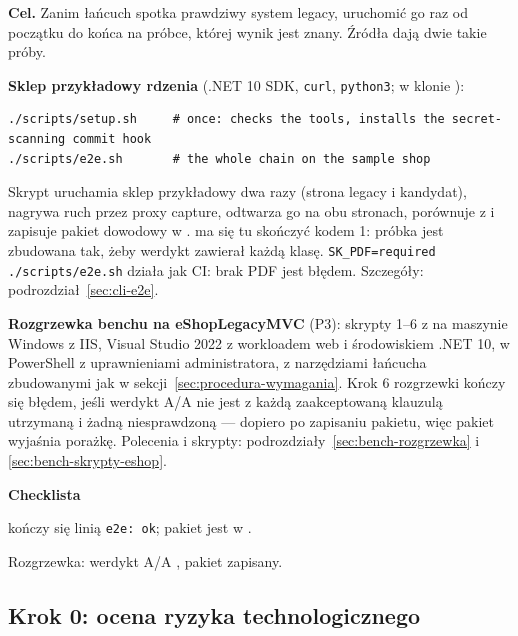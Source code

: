 \textbf{Cel.} Zanim łańcuch spotka prawdziwy system legacy, uruchomić go raz od początku do
końca na próbce, której wynik jest znany. Źródła dają dwie takie próby.

\textbf{Sklep przykładowy rdzenia} (.NET 10 SDK, \texttt{curl}, \texttt{python3}; w klonie
):
\begin{lstlisting}
./scripts/setup.sh     # once: checks the tools, installs the secret-scanning commit hook
./scripts/e2e.sh       # the whole chain on the sample shop
\end{lstlisting}
Skrypt uruchamia sklep przykładowy dwa razy (strona legacy i kandydat), nagrywa ruch przez
proxy capture, odtwarza go na obu stronach, porównuje z 
i zapisuje pakiet dowodowy w .  ma się
tu skończyć kodem 1: próbka jest zbudowana tak, żeby werdykt zawierał każdą klasę.
\texttt{SK\_PDF=required ./scripts/e2e.sh} działa jak CI: brak PDF jest błędem.
Szczegóły: podrozdział~\ref{sec:cli-e2e}.

\textbf{Rozgrzewka benchu na eShopLegacyMVC} (P3): skrypty 1--6 z  na
maszynie Windows z IIS, Visual Studio 2022 z workloadem web i środowiskiem .NET 10,
w PowerShell z uprawnieniami administratora, z narzędziami łańcucha zbudowanymi jak
w sekcji~\ref{sec:procedura-wymagania}. Krok 6 rozgrzewki kończy się błędem, jeśli werdykt
A/A nie jest  z każdą zaakceptowaną klauzulą utrzymaną i żadną
niesprawdzoną --- dopiero po zapisaniu pakietu, więc pakiet wyjaśnia porażkę. Polecenia
i skrypty: podrozdziały~\ref{sec:bench-rozgrzewka} i \ref{sec:bench-skrypty-eshop}.

\textbf{Checklista}
\begin{checklista}
  \item {} kończy się linią \texttt{e2e: ok}; pakiet jest
        w .
  \item Rozgrzewka: werdykt A/A , pakiet zapisany.
\end{checklista}


\subsection{Krok 0: ocena ryzyka technologicznego}\label{sec:procedura-krok0}

